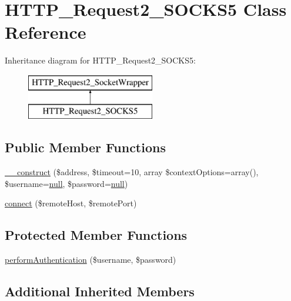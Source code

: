 \hypertarget{classHTTP__Request2__SOCKS5}{}\section{H\+T\+T\+P\+\_\+\+Request2\+\_\+\+S\+O\+C\+K\+S5 Class Reference}
\label{classHTTP__Request2__SOCKS5}
Inheritance diagram for H\+T\+T\+P\+\_\+\+Request2\+\_\+\+S\+O\+C\+K\+S5\+:\begin{figure}[H]
\begin{center}
\leavevmode
\includegraphics[height=2.000000cm]{classHTTP__Request2__SOCKS5}
\end{center}
\end{figure}
\subsection*{Public Member Functions}
\begin{DoxyCompactItemize}
\item 
\hyperlink{classHTTP__Request2__SOCKS5_a5d609d207d0fe50e541200736ad356f0}{\+\_\+\+\_\+construct} (\$address, \$timeout=10, array \$context\+Options=array(), \$username=\hyperlink{modernizr_8min_8js_a286f9ec831c5e676eeb493248eab9575}{null}, \$password=\hyperlink{modernizr_8min_8js_a286f9ec831c5e676eeb493248eab9575}{null})
\item 
\hyperlink{classHTTP__Request2__SOCKS5_ace8abd1469bf004bc8b0f9edc9915d59}{connect} (\$remote\+Host, \$remote\+Port)
\end{DoxyCompactItemize}
\subsection*{Protected Member Functions}
\begin{DoxyCompactItemize}
\item 
\hyperlink{classHTTP__Request2__SOCKS5_ad01bee6f8681e480282bd055468c1dde}{perform\+Authentication} (\$username, \$password)
\end{DoxyCompactItemize}
\subsection*{Additional Inherited Members}



